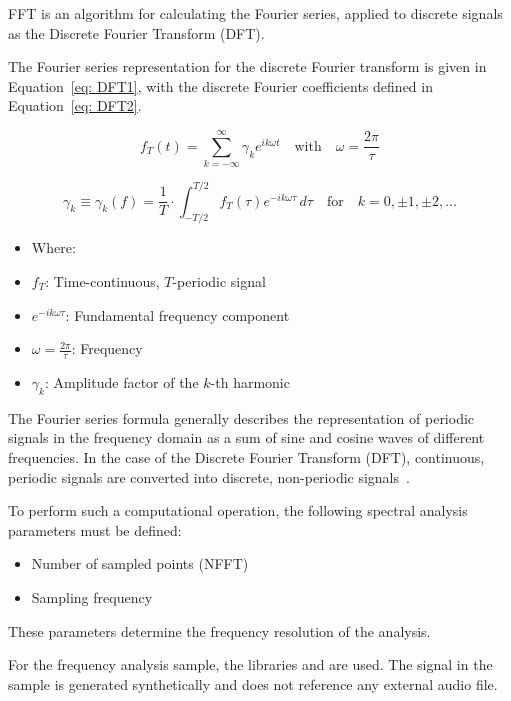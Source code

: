 FFT is an algorithm for calculating the Fourier series, applied to discrete signals as the Discrete Fourier Transform (DFT).

The Fourier series representation for the discrete Fourier transform is given in Equation~\ref{eq: DFT1}, with the discrete Fourier coefficients defined in Equation~\ref{eq: DFT2}.

\begin{equation}
	f_T(t) = \sum_{k=-\infty}^{\infty} \gamma_k e^{ik\omega t} \quad \text{with} \quad \omega = \frac{2\pi}{\tau}
\end{equation}
\label{eq: DFT1}

\begin{equation}
	\gamma_k \equiv \gamma_k(f) = \frac{1}{T} \cdot \int_{-T/2}^{T/2} f_T(\tau) e^{-ik\omega \tau} \, d\tau 
	\quad \text{for} \quad k = 0, \pm1, \pm2, \dots
\end{equation}
\label{eq: DFT2}

\begin{itemize}
	\item[] Where:
	\item[] \( f_T \): Time-continuous, \( T \)-periodic signal
	\item[] \( e^{-ik\omega \tau} \): Fundamental frequency component
	\item[] \( \omega = \frac{2\pi}{\tau} \): Frequency
	\item[] \( \gamma_k \): Amplitude factor of the \( k \)-th harmonic
\end{itemize}

The Fourier series formula generally describes the representation of periodic signals in the frequency domain as a sum of sine and cosine waves of different frequencies.  
In the case of the Discrete Fourier Transform (DFT), continuous, periodic signals are converted into discrete, non-periodic signals~.

To perform such a computational operation, the following spectral analysis parameters must be defined:

\begin{itemize}
	\item Number of sampled points (NFFT)
	\item Sampling frequency
\end{itemize}

These parameters determine the frequency resolution of the analysis.

For the frequency analysis sample, the libraries  and  are used.  
The signal in the sample is generated synthetically and does not reference any external audio file.

